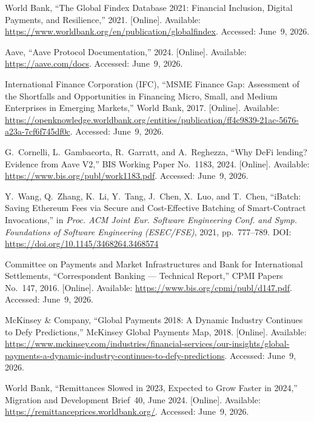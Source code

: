 \documentclass[12pt, a4paper]{report}
\begin{document}
{\begin{enumerate}[label={[\arabic*]}]
\item World Bank, ``The Global Findex Database 2021: Financial Inclusion, Digital Payments, and Resilience,'' 2021. [Online]. Available: \url{https://www.worldbank.org/en/publication/globalfindex}. Accessed: June~9, 2026.

\item Aave, ``Aave Protocol Documentation,'' 2024. [Online]. Available: \url{https://aave.com/docs}. Accessed: June~9, 2026.

\item International Finance Corporation (IFC), ``MSME Finance Gap: Assessment of the Shortfalls and Opportunities in Financing Micro, Small, and Medium Enterprises in Emerging Markets,'' World Bank, 2017. [Online]. Available: \url{https://openknowledge.worldbank.org/entities/publication/ff4c9839-21ac-5676-a23a-7cf6f745df0c}. Accessed: June~9, 2026.

\item G.~Cornelli, L.~Gambacorta, R.~Garratt, and A.~Reghezza, ``Why DeFi lending? Evidence from Aave V2,'' BIS Working Paper No.~1183, 2024. [Online]. Available: \url{https://www.bis.org/publ/work1183.pdf}. Accessed: June~9, 2026.

\item Y.~Wang, Q.~Zhang, K.~Li, Y.~Tang, J.~Chen, X.~Luo, and T.~Chen, ``iBatch: Saving Ethereum Fees via Secure and Cost-Effective Batching of Smart-Contract Invocations,'' in \textit{Proc. ACM Joint Eur. Software Engineering Conf. and Symp. Foundations of Software Engineering (ESEC/FSE)}, 2021, pp.~777--789. DOI: \url{https://doi.org/10.1145/3468264.3468574}

\item Committee on Payments and Market Infrastructures and Bank for International Settlements, ``Correspondent Banking --- Technical Report,'' CPMI Papers No.~147, 2016. [Online]. Available: \url{https://www.bis.org/cpmi/publ/d147.pdf}. Accessed: June~9, 2026.

\item McKinsey \& Company, ``Global Payments 2018: A Dynamic Industry Continues to Defy Predictions,'' McKinsey Global Payments Map, 2018. [Online]. Available: \url{https://www.mckinsey.com/industries/financial-services/our-insights/global-payments-a-dynamic-industry-continues-to-defy-predictions}. Accessed: June~9, 2026.

\item World Bank, ``Remittances Slowed in 2023, Expected to Grow Faster in 2024,'' Migration and Development Brief~40, June 2024. [Online]. Available: \url{https://remittanceprices.worldbank.org/}. Accessed: June~9, 2026.


\end{enumerate}}
\end{document}
